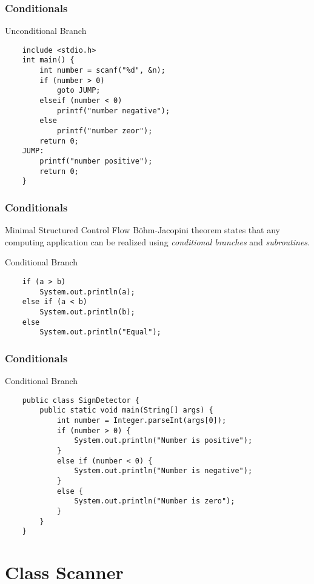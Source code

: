 \documentclass[10pt, compress]{beamer}
\begin{document}
\begin{frame}[fragile]
	\frametitle{Conditionals}
	\begin{block}{Unconditional Branch}
		\begin{verbatim}
	include <stdio.h>
	int main() {
		int number = scanf("%d", &n);
		if (number > 0)
			goto JUMP;
		elseif (number < 0)
			printf("number negative");
		else
			printf("number zeor");
		return 0;
	JUMP:
		printf("number positive");
		return 0;
	}
		\end{verbatim}
	\end{block}
\end{frame}

\begin{frame}[fragile]
	\frametitle{Conditionals}
	\begin{block}{Minimal Structured Control Flow}
		Böhm-Jacopini theorem states that any computing application can be realized using \emph{conditional branches} and \emph{subroutines}.
	\end{block}
	\begin{block}{Conditional Branch}
		\begin{verbatim}
	if (a > b)
		System.out.println(a);
	else if (a < b)
		System.out.println(b);
	else
		System.out.println("Equal");
		\end{verbatim}
	\end{block}
\end{frame}

\begin{frame}[fragile]
	\frametitle{Conditionals}
	\begin{block}{Conditional Branch}
		\begin{verbatim}
	public class SignDetector {
		public static void main(String[] args) {
			int number = Integer.parseInt(args[0]);
			if (number > 0) {
				System.out.println("Number is positive");
			}
			else if (number < 0) {
				System.out.println("Number is negative");
			}
			else {
				System.out.println("Number is zero");
			}
		}
	}
		\end{verbatim}
	\end{block}
\end{frame}

\section{Class Scanner}
\end{document}
